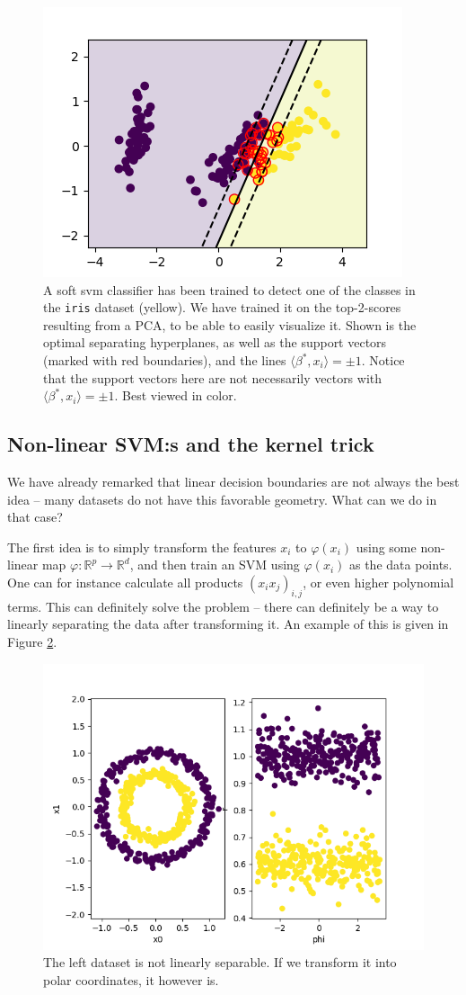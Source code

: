 \documentclass{article}
\newcommand{\sprod}[1]{\langle #1 \rangle}
\newcommand{\R}{\mathbb{R}}
\begin{document}
\begin{figure}
    \centering
    \includegraphics[width=0.5\linewidth]{graphics/svm_classifier_violation.png}
    \caption{A soft svm classifier has been trained to detect one of the classes in the \texttt{iris} dataset (yellow). We have trained it on the top-2-scores resulting from a PCA, to be able to easily visualize it. Shown is the optimal separating hyperplanes, as well as the support vectors (marked with red boundaries), and the lines $\sprod{\beta^*,x_i}=\pm 1$. Notice that the support vectors here are not necessarily vectors with $\sprod{\beta^*,x_i}=\pm 1$. Best viewed in color. }
    \label{fig:svm_soft}
\end{figure}
\subsection{Non-linear SVM:s and the kernel trick}
We have already remarked that linear decision boundaries are not always the best idea -- many datasets do not have this favorable geometry. What can we do in that case?

The first idea is to simply transform the features $x_i$ to $\varphi(x_i)$ using some non-linear map $\varphi: \R^p \to \R^d$, and then train an SVM using $\varphi(x_i)$ as the data points. One can for instance calculate all products $(x_ix_j)_{i,j}$, or even higher polynomial terms. This can definitely solve the problem -- there can definitely be a way to linearly separating the data after transforming it. An example of this is given in Figure \ref{fig:polar}.

\begin{figure}
    \centering
    \includegraphics[width=0.5\linewidth]{graphics/polar.png}
    \caption{The left dataset is not linearly separable. If we transform it into polar coordinates, it however is.}
    \label{fig:polar}
\end{figure}
\end{document}
